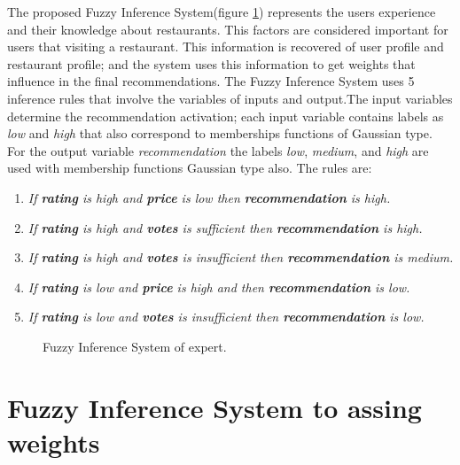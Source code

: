 The proposed Fuzzy Inference System(figure \ref{fig:expertfis})
represents the users experience and their knowledge about restaurants.
This factors are considered important  for users that visiting a
restaurant. This information is recovered of user profile and
restaurant profile; and the system uses this information to get
weights that influence in the final recommendations. The Fuzzy
Inference System uses 5 inference rules that involve the variables of
inputs and output.The input variables determine the recommendation
activation; each input variable contains labels as \textit{low} and
\textit{high} that also correspond to memberships functions of
Gaussian type. For the output variable \textit{recommendation} the
labels \textit{low}, \textit{medium}, and \textit{high} are used with
membership functions Gaussian type also. The rules are:
\begin{enumerate} 
\item \textit{If \textbf{rating} is high and \textbf{price} is low then \textbf{recommendation} is high.}
\item \textit{If \textbf{rating} is high and \textbf{votes} is sufficient then \textbf{recommendation} is high.}
\item \textit{If \textbf{rating} is high and \textbf{votes} is insufficient then \textbf{recommendation} is medium.}
\item \textit{If \textbf{rating} is low and \textbf{price} is high and then \textbf{recommendation} is low.} 
\item \textit{If \textbf{rating} is low and \textbf{votes} is insufficient then \textbf{recommendation} is low.}
\end{enumerate} 
\begin{figure}
\captionsetup{justification=centering,margin=2cm}
\centering
{}
\caption{Fuzzy Inference System of expert.}
\label{fig:expertfis}       %
\end{figure}

\section{Fuzzy Inference System to assing weights} 


